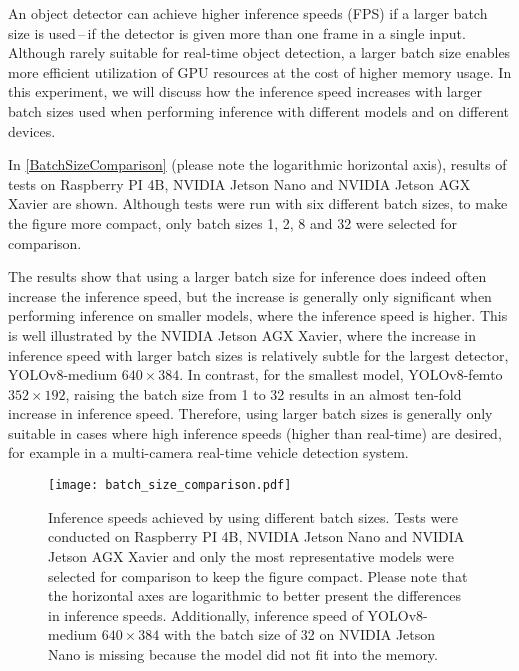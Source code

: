 An object detector can achieve higher inference speeds (FPS) if a larger batch
size is used\,--\,if the detector is given more than one frame in a single
input. Although rarely suitable for real-time object detection, a larger batch
size enables more efficient utilization of GPU resources at the cost of higher
memory usage. In this experiment, we will discuss how the inference speed
increases with larger batch sizes used when performing inference with different
models and on different devices.

In \autoref{BatchSizeComparison} (please note the logarithmic horizontal axis),
results of tests on Raspberry PI 4B, NVIDIA Jetson Nano and NVIDIA Jetson AGX
Xavier are shown. Although tests were run with six different batch sizes, to
make the figure more compact, only batch sizes 1, 2, 8 and 32 were selected for
comparison.

The results show that using a larger batch size for inference does indeed often
increase the inference speed, but the increase is generally only significant
when performing inference on smaller models, where the inference speed is
higher. This is well illustrated by the NVIDIA Jetson AGX Xavier, where the
increase in inference speed with larger batch sizes is relatively subtle for the
largest detector, YOLOv8-medium $640 \times 384$. In contrast, for the smallest
model, YOLOv8-femto $352 \times 192$, raising the batch size from 1 to 32
results in an almost ten-fold increase in inference speed. Therefore, using
larger batch sizes is generally only suitable in cases where high inference
speeds (higher than real-time) are desired, for example in a multi-camera
real-time vehicle detection system.


\begin{figure}[t]
    \begin{framed}
        \centering
        \texttt{[image: batch\_size\_comparison.pdf]}
        \caption{Inference speeds achieved by using different batch sizes. Tests
        were conducted on Raspberry PI 4B, NVIDIA Jetson Nano and NVIDIA Jetson
        AGX Xavier and only the most representative models were selected for
        comparison to keep the figure compact. Please note that the horizontal
        axes are logarithmic to better present the differences in inference
        speeds. Additionally, inference speed of YOLOv8-medium $640 \times 384$
        with the batch size of 32 on NVIDIA Jetson Nano is missing because the
        model did not fit into the memory.}
        \label{BatchSizeComparison}
    \end{framed}
\end{figure}





